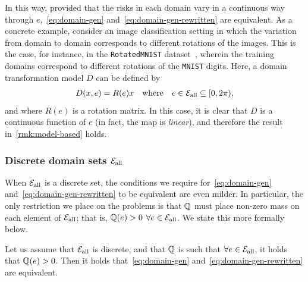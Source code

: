 \documentclass{article}
\begin{document}
In this way, provided that the risks in each domain vary in a continuous way through $e$,~\eqref{eq:domain-gen} and~\eqref{eq:domain-gen-rewritten} are equivalent.  As a concrete example, consider an image classification setting in which the variation from domain to domain corresponds to different rotations of the images.  This is the case, for instance, in the \texttt{RotatedMNIST} dataset~\cite{ilse2020diva,gulrajani2020search}, wherein the training domains correspond to different rotations of the \texttt{MNIST} digits.  Here, a domain transformation model $D$ can be defined by
%
\begin{align}
    D(x, e) = R(e)x \quad\text{where}\quad e\in{\mathcal{E}_\text{all}} \subseteq [0, 2\pi),
\end{align}
%
and where $R(e)$ is a rotation matrix.  In this case, it is clear that $D$ is a continuous function of $e$ (in fact, the map is \emph{linear}), and therefore the result in~\eqref{rmk:model-based} holds.



\subsubsection{Discrete domain sets \texorpdfstring{${\mathcal{E}_\text{all}}$}{E}} \label{sec:disc-domain-set}

When ${\mathcal{E}_\text{all}}$ is a discrete set, the conditions we require for~\eqref{eq:domain-gen} and~\eqref{eq:domain-gen-rewritten} to be equivalent are even milder.  In particular, the only restriction we place on the problems is that $\mathbb{Q}$ must place non-zero mass on each element of ${\mathcal{E}_\text{all}}$; that is, $\mathbb{Q}(e) > 0$ $\forall e\in{\mathcal{E}_\text{all}}$.  We state this more formally below.

\begin{proposition} 
Let us assume that ${\mathcal{E}_\text{all}}$ is discrete, and that $\mathbb{Q}$ is such that $\forall e\in{\mathcal{E}_\text{all}}$, it holds that $\mathbb{Q}(e) > 0$.  Then it holds that~\eqref{eq:domain-gen} and~\eqref{eq:domain-gen-rewritten} are equivalent.
\end{proposition}
\end{document}
